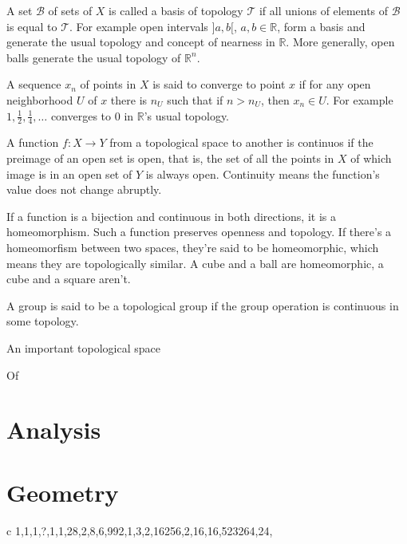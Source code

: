 \documentclass[11pt,oneside,%
]{memoir}
\newenvironment{eqna}{\begin{IEEEeqnarray}{c}}{\end{IEEEeqnarray}\ignorespacesafterend}
\theoremstyle{definition}
\newcommand{\RR}{\mathbb{R}}
\begin{document}
A set \(\mathcal{B}\) of sets of \(X\) is called a basis of topology \(\mathcal{T}\) if all unions of elements of \(\mathcal{B}\) is equal to \(\mathcal{T}\). For example open intervals \(]a,b[\), \(a,b\in\RR\), form a basis and generate the usual topology and concept of nearness in \(\RR\). More generally, open balls generate the usual topology of \(\RR^n\).

A sequence \(x_n\) of points in \(X\) is said to converge to point \(x\) if for any open neighborhood \(U\) of \(x\) there is \(n_U\) such that if \(n>n_U\), then \(x_n\in U\). For example \(1,\frac{1}{2},\frac{1}{4},\dotsc\) converges to \(0\) in \(\RR\)'s usual topology.

A function \(f:X\rightarrow Y\) from a topological space to another is continuos if the preimage of an open set is open, that is, the set of all the points in \(X\) of which image is in an open set of \(Y\) is always open. Continuity means the function's value does not change abruptly.

If a function is a bijection and continuous in both directions, it is a homeomorphism. Such a function preserves openness and topology. If there's a homeomorfism between two spaces, they're said to be homeomorphic, which means they are topologically similar. A cube and a ball are homeomorphic, a cube and a square aren't.


A group is said to be a topological group if the group operation is continuous in some topology.

An important topological space


Of









    

\section{Analysis}




\section{Geometry}

\begin{eqna}
    1,1,1,?,1,1,28,2,8,6,992,1,3,2,16256,2,16,16,523264,24,\dotsc\nonumber
\end{eqna}
\end{document}
